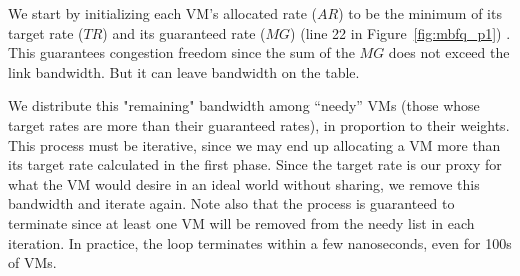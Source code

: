 We start by initializing each VM's allocated rate ($AR$) to be the minimum of its 
target rate ($TR$)
and its guaranteed rate ($MG$) (line 22  in Figure~\ref{fig:mbfq_p1}) .  
This guarantees congestion freedom since the
sum of the $MG$ does not exceed the link bandwidth.  But it can leave bandwidth
on the table.

We distribute this "remaining" bandwidth among ``needy'' VMs (those whose target
rates are more than their guaranteed rates), in proportion to their weights.
This process must be iterative, since we may end up allocating a VM more than
its target rate calculated in the first phase.  Since the target rate is our
proxy for what the VM would desire in an ideal world without sharing, we remove
this bandwidth and iterate again.  Note also that the process is guaranteed to
terminate since at least one VM will be removed from the needy list in each
iteration. In practice, the loop terminates within a few nanoseconds, even for
100s of VMs.
